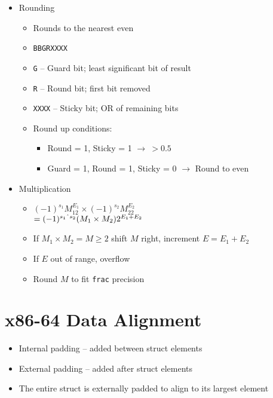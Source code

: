 \documentclass[twocolumn]{article}
\renewcommand{\tt}[1]{\texttt{#1}}
\begin{document}
\begin{itemize}[noitemsep]
\begin{itemize}[noitemsep]
    \end{itemize}
    \item Rounding
    \begin{itemize}[noitemsep]
        \item Rounds to the nearest even
        \item \tt{BBGRXXXX}
        \item \tt{G} -- Guard bit; least significant bit of result
        \item \tt{R} -- Round bit; first bit removed
        \item \tt{XXXX} -- Sticky bit; OR of remaining bits
        \item Round up conditions:
        \begin{itemize}[noitemsep]
            \item Round = 1, Sticky = 1 $\to\  > 0.5$
            \item Guard = 1, Round = 1, Sticky = 0 $\to$ Round to even
        \end{itemize}
    \end{itemize}
    \item Multiplication
    \begin{itemize}[noitemsep]
        \item $(-1)^{s_1}M_12^{E_1} \times (-1)^{s_2}M_22^{E_2}$ \\
              \null \qquad \qquad \qquad \qquad $= (-1)^{s_1 \string^ s_2}(M_1 \times M_2)2^{E_1 + E_2}$
        \item If $M_1 \times M_2 = M \geq 2$ shift $M$ right, increment $E = E_1 + E_2$
        \item If $E$ out of range, overflow
        \item Round $M$ to fit \tt{frac} precision
    \end{itemize}
\end{itemize}

\vfill
\pagebreak

\section{x86-64 Data Alignment}
\begin{itemize}[noitemsep]
    \item Internal padding -- added between struct elements
    \item External padding -- added after struct elements
    \item The entire struct is externally padded to align to its largest element
\end{itemize}
\end{document}
